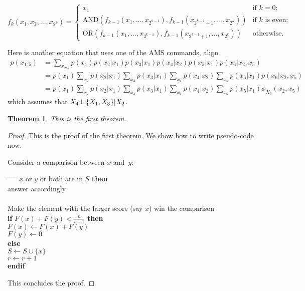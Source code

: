 \documentclass{article}
\newcounter{lecnum}
\newcommand{\indep}{{\bot\negthickspace\negthickspace\bot}}
\newtheorem{theorem}{Theorem}[lecnum]
\begin{document}
\[ f_k(x_1, x_2, \ldots, x_{2^k}) = \left\{ \begin{array}{ll}

	x_1 & \mbox{if $k = 0$;} \\

	\mbox{AND}(f_{k-1}(x_1, \ldots, x_{2^{k-1}}),
	   f_{k-1}(x_{2^{k-1} + 1}, \ldots, x_{2^k}))
	 & \mbox{if $k$ is even;} \\

	\mbox{OR}(f_{k-1}(x_1, \ldots, x_{2^{k-1}}),
	   f_{k-1}(x_{2^{k-1} + 1}, \ldots, x_{2^k}))	
	& \mbox{otherwise.} 
	\end{array}
	\right. \]

Here is another equation that uses one of the AMS commands, align
{\small 
\begin{align*}
p(x_{1:5}) & = 
\sum_{x_{2:5}} 
p(x_1)p(x_2|x_1)p(x_3|x_1)p(x_4|x_2)
p(x_5|x_1)p(x_6|x_2,x_5) \\
& =  
p(x_1)\sum_{x_2}p(x_2|x_1)\sum_{x_3}p(x_3|x_1)\sum_{x_4}p(x_4|x_2)
\sum_{x_5}p(x_5|x_1)p(x_6|x_2,x_5) \\
& =  
p(x_1)\sum_{x_2}p(x_2|x_1)\sum_{x_3}p(x_3|x_1)\sum_{x_4}p(x_4|x_2)
\sum_{x_5}p(x_5|x_1)\phi_{X_6}(x_2,x_5)
\end{align*}
}
which assumes that $X_4 \indep \{ X_1, X_3 \} | X_2$.

\begin{theorem}
This is the first theorem.
\end{theorem}

\begin{proof}
This is the proof of the first theorem. We show how to write pseudo-code now.

Consider a comparison between $x$ and~$y$:
\begin{tabbing}
\hspace*{.25in} \= \hspace*{.25in} \= \hspace*{.25in} \= \hspace*{.25in} \= \hspace*{.25in} \=\kill
{} $x$ or $y$ or both are in $S$ {\bf then } \\
\>\> answer accordingly \\
 \\
\>\>    Make the element with the larger score (say $x$) win the comparison \\
\>\> {\bf if} $F(x) + F(y) < \frac{n}{t-1}$ {\bf then} \\%
\>\>\> $F(x) \leftarrow F(x) + F(y)$ \\
\>\>\> $F(y) \leftarrow 0$ \\
\>\> {\bf else}  \\
\>\>\> $S \leftarrow S \cup \{ x \} $ \\
\>\>\> $r \leftarrow r+1$ \\
\>\> {\bf endif} \\
\end{tabbing}

This concludes the proof.
\end{proof}
\end{document}
